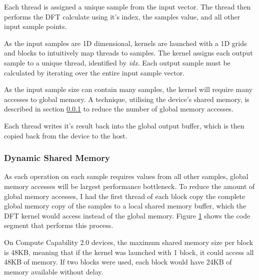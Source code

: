 \documentclass[11pt,a4paper]{article}
\begin{document}
Each thread is assigned a unique sample from the input vector. The thread then performs the DFT calculate using it's index, the samples value, and all other input sample points.

As the input samples are 1D dimensional, kernels are launched with a 1D grids and blocks to intuitively map threads to samples.
 The kernel assigns each output sample to a unique thread, identified by \textit{idx}. Each output sample must be calculated by iterating over the entire input sample vector. 

As the input sample size can contain many samples, the kernel will require many accesses to global memory. A technique, utilising the device's shared memory, is described in section \ref{sect:Dynamic Shared Memory} to reduce the number of global memory accesses.

Each thread writes it's result back into the global output buffer, which is then copied back from the device to the host.

\subsubsection{Dynamic Shared Memory} \label{sect:Dynamic Shared Memory}
As each operation on each sample requires values from all other samples, global memory accesses will be largest performance bottleneck. To reduce the amount of global memory accesses, I had the first thread of each block copy the complete global memory copy of the samples to a local shared memory buffer, which the DFT kernel would access instead of the global memory. Figure \ref{fig:code_cuda_all} shows the code segment that performs this process.

On Compute Capability 2.0 devices, the maximum shared memory size per block is 48KB, meaning that if the kernel was launched with 1 block, it could access all 48KB of memory. If two blocks were used, each block would have 24KB of memory available without delay.

\begin{figure}[H]%
    \centering
    \qquad
    \vspace{5pt}
    \caption{}
    \label{fig:code_cuda_all}%
\end{figure}
\end{document}
